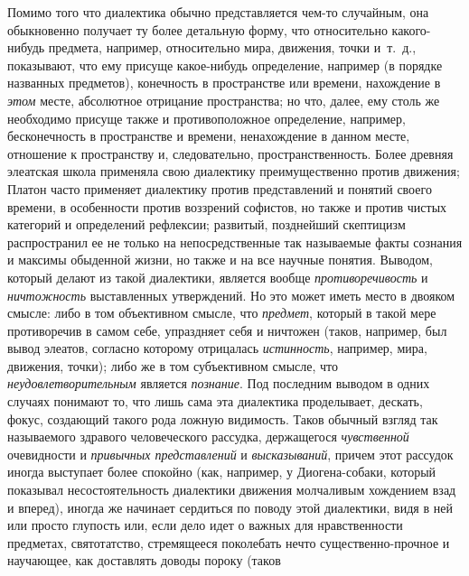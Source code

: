 {{Помимо того что диалектика обычно представляется чем-то
случайным, она обыкновенно получает ту более детальную форму, что
относительно какого-нибудь предмета, например, относительно мира, движения,
точки и~т.~д., показывают, что ему присуще какое-нибудь определение,
например (в порядке названных предметов), конечность в пространстве или
времени, нахождение в {\em этом}
месте, абсолютное отрицание пространства; но что, далее, ему
столь же необходимо присуще также и противоположное определение, например,
бесконечность в пространстве и времени, ненахождение в данном месте,
отношение к пространству и, следовательно, пространственность. Более
древняя элеатская школа применяла свою диалектику преимущественно против
движения; Платон часто применяет диалектику против представлений и понятий
своего времени, в особенности против воззрений софистов, но также и против
чистых категорий и определений рефлексии; развитый, позднейший скептицизм
распространил ее не только на непосредственные так называемые факты
сознания и максимы обыденной жизни, но также и на все научные понятия.
Выводом, который делают из такой диалектики, является вообще
{\em противоречивость} и {\em ничтожность}
выставленных утверждений. Но это может иметь место в двояком
смысле: либо в том объективном смысле, что {\em предмет}, который в
такой мере противоречив в самом себе, упраздняет себя и ничтожен (таков,
например, был вывод элеатов, согласно которому отрицалась {\em истинность},
например, мира, движения, точки); либо же в том субъективном
смысле, что {\em неудовлетворительным} является {\em познание}.
Под последним выводом в одних случаях понимают то, что лишь
сама эта диалектика проделывает, дескать, фокус, создающий такого рода
ложную видимость. Таков обычный взгляд так называемого здравого
человеческого рассудка, держащегося {\em чувственной} очевидности и
{\em привычных представлений} и {\em высказываний},
причем этот рассудок иногда выступает более спокойно (как, например, у
Диогена-собаки,
который показывал несостоятельность диалектики движения
молчаливым хождением взад и вперед), иногда же начинает сердиться по поводу
этой диалектики, видя в ней или просто глупость или, если дело идет о
важных для нравственности предметах, святотатство, стремящееся поколебать
нечто существенно-прочное и научающее, как доставлять доводы пороку (таков
}}
